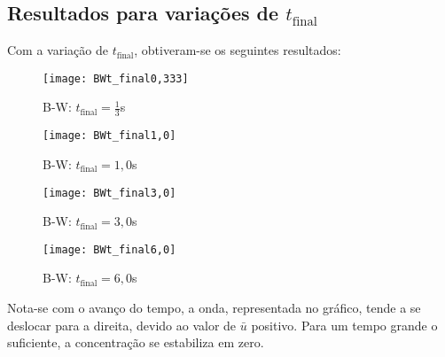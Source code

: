 \subsection{Resultados para variações de $t_{\text{final}}$}
Com a variação de $t_{\text{final}}$, obtiveram-se os seguintes resultados:
\begin{figure}[H]
    \centering
    \texttt{[image: BWt\_final0,333]}
    \caption{B-W: $t_{\text{final}} = \frac{1}{3}$s}
\end{figure}
\begin{figure}[H]
    \centering
    \texttt{[image: BWt\_final1,0]}
    \caption{B-W: $t_{\text{final}} = 1,0$s}
\end{figure}
\begin{figure}[H]
    \centering
    \texttt{[image: BWt\_final3,0]}
    \caption{B-W: $t_{\text{final}} = 3,0$s}
\end{figure}
\begin{figure}[H]
    \centering
    \texttt{[image: BWt\_final6,0]}
    \caption{B-W: $t_{\text{final}} = 6,0$s}
\end{figure}
Nota-se com o avanço do tempo, a onda, representada no gráfico, tende a se
deslocar para a direita, devido ao valor de $\bar{u}$ positivo. Para um tempo
grande o suficiente, a concentração se estabiliza em zero.